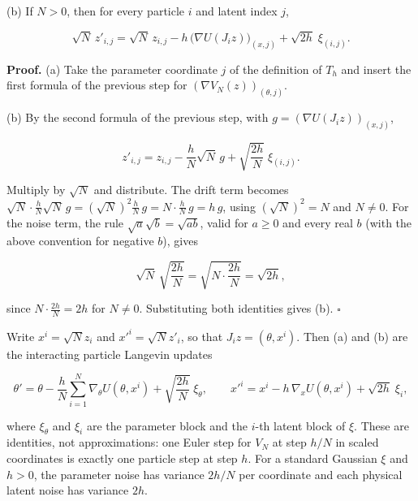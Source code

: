 \documentclass[11pt,a4paper]{report}
\begin{document}
(b) If \(N>0\), then for every particle \(i\) and latent index \(j\),


\[\sqrt N\,z'_{i,j}=\sqrt N\,z_{i,j}-h\,\bigl(\nabla U(J_iz)\bigr)_{(x,j)}+\sqrt{2h}\;\xi_{(i,j)} .\]


\textbf{Proof.} (a) Take the parameter coordinate \(j\) of the definition of \(T_h\) and insert the first formula of the previous step for \((\nabla V_N(z))_{(\theta,j)}\).




(b) By the second formula of the previous step, with \(g=(\nabla U(J_iz))_{(x,j)}\),


\[z'_{i,j}=z_{i,j}-\frac hN\sqrt N\,g+\sqrt{\frac{2h}N}\;\xi_{(i,j)} .\]


Multiply by \(\sqrt N\) and distribute. The drift term becomes \(\sqrt N\cdot\frac hN\sqrt N\,g=(\sqrt N)^2\frac hN\,g=N\cdot\frac hN\,g=h\,g\), using \((\sqrt N)^2=N\) and \(N\ne0\). For the noise term, the rule \(\sqrt a\sqrt b=\sqrt{ab}\), valid for \(a\ge0\) and every real \(b\) (with the above convention for negative \(b\)), gives


\[\sqrt N\,\sqrt{\frac{2h}N}=\sqrt{N\cdot\frac{2h}N}=\sqrt{2h},\]


since \(N\cdot\frac{2h}N=2h\) for \(N\ne0\). Substituting both identities gives (b). \(\square\)




Write \(x^i=\sqrt Nz_i\) and \(x'^i=\sqrt Nz'_i\), so that \(J_iz=(\theta,x^i)\). Then (a) and (b) are the interacting particle Langevin updates


\[\theta'=\theta-\frac hN\sum_{i=1}^N\nabla_\theta U(\theta,x^i)+\sqrt{\frac{2h}N}\;\xi_\theta,\qquad x'^i=x^i-h\,\nabla_xU(\theta,x^i)+\sqrt{2h}\;\xi_i,\]


where \(\xi_\theta\) and \(\xi_i\) are the parameter block and the \(i\)-th latent block of \(\xi\). These are identities, not approximations: one Euler step for \(V_N\) at step \(h/N\) in scaled coordinates is exactly one particle step at step \(h\). For a standard Gaussian \(\xi\) and \(h>0\), the parameter noise has variance \(2h/N\) per coordinate and each physical latent noise has variance \(2h\).
\end{document}
